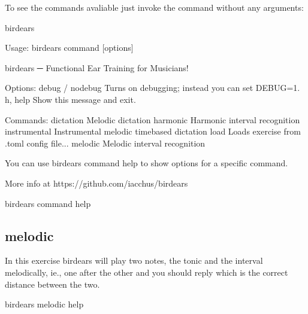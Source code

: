 \documentclass[letterpaper,10pt,english]{sphinxmanual}
\begin{document}
To see the commands avaliable just invoke the command without any arguments:

\begin{sphinxVerbatim}[commandchars=\\\{\}]
birdears
\end{sphinxVerbatim}

\begin{sphinxVerbatim}[commandchars=\\\{\}]
Usage: birdears  \PYGZlt{}command\PYGZgt{} [options]

  birdears ─ Functional Ear Training for Musicians!

Options:
  \PYGZhy{}\PYGZhy{}debug / \PYGZhy{}\PYGZhy{}no\PYGZhy{}debug  Turns on debugging; instead you can set DEBUG=1.
  \PYGZhy{}h, \PYGZhy{}\PYGZhy{}help            Show this message and exit.

Commands:
  dictation     Melodic dictation
  harmonic      Harmonic interval recognition
  instrumental  Instrumental melodic time\PYGZhy{}based dictation
  load          Loads exercise from .toml config file...
  melodic       Melodic interval recognition

  You can use \PYGZsq{}birdears \PYGZlt{}command\PYGZgt{} \PYGZhy{}\PYGZhy{}help\PYGZsq{} to show options for a specific
  command.

  More info at https://github.com/iacchus/birdears
\end{sphinxVerbatim}

\begin{sphinxVerbatim}[commandchars=\\\{\}]
birdears \PYGZlt{}command\PYGZgt{} \PYGZhy{}\PYGZhy{}help
\end{sphinxVerbatim}


\subsection{melodic}
\label{\detokenize{using:melodic}}
In this exercise birdears will play two notes, the tonic and the interval
melodically, ie., one after the other and you should reply which is the
correct distance between the two.

\begin{sphinxVerbatim}[commandchars=\\\{\}]
birdears melodic \PYGZhy{}\PYGZhy{}help
\end{sphinxVerbatim}
\end{document}
